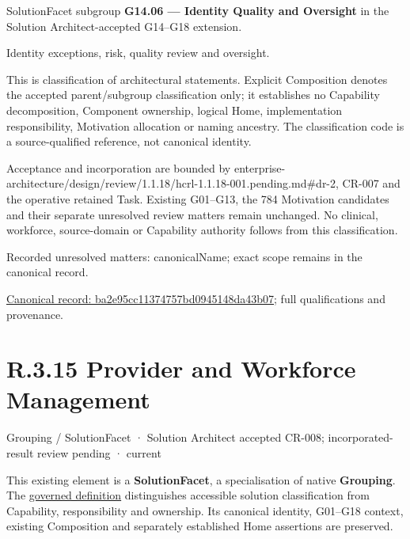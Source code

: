 SolutionFacet subgroup \textbf{G14.06 — Identity Quality and Oversight} in the Solution Architect-accepted G14–G18 extension.



Identity exceptions, risk, quality review and oversight.



This is classification of architectural statements. Explicit Composition denotes the accepted parent/subgroup classification only; it establishes no Capability decomposition, Component ownership, logical Home, implementation responsibility, Motivation allocation or naming ancestry. The classification code is a source-qualified reference, not canonical identity.



Acceptance and incorporation are bounded by enterprise-architecture/design/review/1.1.18/hcrl-1.1.18-001.pending.md\#dr-2, CR-007 and the operative retained Task. Existing G01–G13, the 784 Motivation candidates and their separate unresolved review matters remain unchanged. No clinical, workforce, source-domain or Capability authority follows from this classification.


{\small Recorded unresolved matters: canonicalName; exact scope remains in the canonical record.}\par
{\footnotesize \href{../../../../../../../continuum/grouping/ba2e95cc11374757bd0945148da43b07.md}{Canonical record: ba2e95cc11374757bd0945148da43b07}; full qualifications and provenance.}\par
\section*{R.3.15 Provider and Workforce Management}
\label{navigation:R.3.15}

\label{element:fd9d0fa7117a4dc3b45cfed0e7be614b}
{\small Grouping / SolutionFacet · Solution Architect accepted CR-008; incorporated-result review pending · current}\par

This existing element is a \textbf{SolutionFacet}, a specialisation of native
\textbf{Grouping}. The \href{\detokenize{../../../../../../../governance/continuum-representation.md#solutionfacet-classification--1119-candidate}}{governed definition}
distinguishes accessible solution classification from Capability, responsibility
and ownership. Its canonical identity, G01–G18 context, existing Composition
and separately established Home assertions are preserved.



